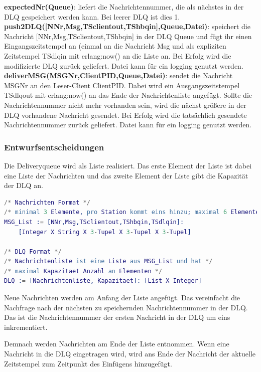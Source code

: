 \documentclass{article}
\begin{document}
\textbf{expectedNr(Queue)}: liefert die Nachrichtennummer, die als nächstes in der DLQ gespeichert werden kann.
Bei leerer DLQ ist dies 1.\\

\textbf{push2DLQ([NNr,Msg,TSclientout,TShbqin],Queue,Datei)}: speichert die Nachricht [NNr,Msg,TSclientout,TShbqin] in
der DLQ Queue und fügt ihr einen Eingangszeitstempel an (einmal an die Nachricht Msg und als expliziten Zeitstempel
TSdlqin mit erlang:now() an die Liste an. Bei Erfolg wird die modifizierte DLQ zurück geliefert. Datei kann für ein
logging genutzt werden.\\

\textbf{deliverMSG(MSGNr,ClientPID,Queue,Datei)}: sendet die Nachricht MSGNr an den Leser-Client ClientPID. Dabei wird
ein Ausgangszeitstempel TSdlqout mit erlang:now() an das Ende der Nachrichtenliste angefügt. Sollte die Nachrichtennummer
nicht mehr vorhanden sein, wird die nächst größere in der DLQ vorhandene Nachricht gesendet. Bei Erfolg wird die
tatsächlich gesendete Nachrichtennummer zurück geliefert. Datei kann für ein logging genutzt werden.\\

\subsubsection{Entwurfsentscheidungen}
Die Deliveryqueue wird als Liste realisiert. Das erste Element der Liste ist dabei eine Liste der Nachrichten und das
zweite Element der Liste gibt die Kapazität der DLQ an.
\begin{lstlisting}[language=erlang]
/* Nachrichten Format */
/* minimal 3 Elemente, pro Station kommt eins hinzu; maximal 6 Elemente */
MSG_List := [NNr,Msg,TSclientout,TShbqin,TSdlqin]:
    [Integer X String X 3-Tupel X 3-Tupel X 3-Tupel]

/* DLQ Format */
/* Nachrichtenliste ist eine Liste aus MSG_List und hat */
/* maximal Kapazitaet Anzahl an Elementen */
DLQ := [Nachrichtenliste, Kapazitaet]: [List X Integer]
\end{lstlisting}

Neue Nachrichten werden am Anfang der Liste angefügt. Das vereinfacht die Nachfrage nach der nächsten zu speichernden
Nachrichtennummer in der DLQ. Das ist die Nachrichtennummer der ersten Nachricht in der DLQ um eins inkrementiert.

Demnach werden Nachrichten am Ende der Liste entnommen. Wenn eine Nachricht in die DLQ eingetragen wird, wird ans Ende
der Nachricht der aktuelle Zeitstempel zum Zeitpunkt des Einfügens hinzugefügt.
\end{document}
